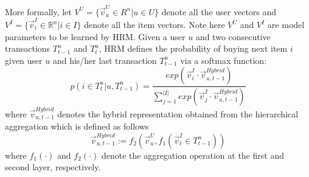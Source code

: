 \documentclass[10pt,journal,compsoc]{IEEEtran}
\begin{document}
More formally, let $V^U=\{\vec{v}^U_u\in {R}^n|u\in U\}$ denote all the user vectors and $V^I=\{\vec{v}^I_i\in \mathbb{R}^n|i\in I\}$ denote all the item vectors. Note here $V^U$ and $V^I$ are model parameters to be learned by HRM. Given a user $u$ and two consecutive transactions $T^u_{t-1}$ and $T^u_t$, HRM defines the probability of buying next item $i$ given user $u$ and his/her last transaction $T^u_{t-1}$ via a softmax function:
%
\begin{equation}
    \label{eq:softmax}
  p(i\in T^u_t|u,T^u_{t-1})=\frac{exp(\vec{v}^I_i\cdot\vec{v}^{Hybrid}_{u,t-1})}{\sum_{j=1}^{|I|}exp(\vec{v}^I_j\cdot\vec{v}^{Hybrid}_{u,t-1})}
\end{equation}
where $\vec{v}^{Hybrid}_{u,t-1}$ denotes the hybrid representation obtained from the hierarchical aggregation which is defined as follows
\begin{displaymath}
\vec{v}^{Hybrid}_{u,t-1}:=f_2(\vec{v}^U_u,f_1(\vec{v}^I_{l}\in T^u_{t-1}))
\end{displaymath}
where $f_1(\cdot)$ and $f_2(\cdot)$ denote the aggregation operation at the first and second layer, respectively.
\end{document}
